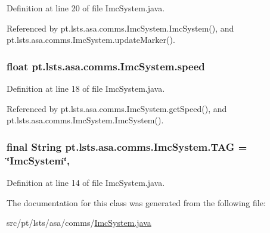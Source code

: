 Definition at line 20 of file Imc\+System.\+java.



Referenced by pt.\+lsts.\+asa.\+comms.\+Imc\+System.\+Imc\+System(), and pt.\+lsts.\+asa.\+comms.\+Imc\+System.\+update\+Marker().

\hypertarget{classpt_1_1lsts_1_1asa_1_1comms_1_1ImcSystem_a425d911ad6689aef73a9103ca5621db6}{}
\subsubsection[{speed}]{\setlength{\rightskip}{0pt plus 5cm}float pt.\+lsts.\+asa.\+comms.\+Imc\+System.\+speed\hspace{0.3cm}{\ttfamily [private]}}\label{classpt_1_1lsts_1_1asa_1_1comms_1_1ImcSystem_a425d911ad6689aef73a9103ca5621db6}


Definition at line 18 of file Imc\+System.\+java.



Referenced by pt.\+lsts.\+asa.\+comms.\+Imc\+System.\+get\+Speed(), and pt.\+lsts.\+asa.\+comms.\+Imc\+System.\+Imc\+System().

\hypertarget{classpt_1_1lsts_1_1asa_1_1comms_1_1ImcSystem_a1349eeeaa351e92843c1618d4f0ac5e6}{}
\subsubsection[{T\+A\+G}]{\setlength{\rightskip}{0pt plus 5cm}final String pt.\+lsts.\+asa.\+comms.\+Imc\+System.\+T\+A\+G = \char`\"{}Imc\+System\char`\"{}\hspace{0.3cm}{\ttfamily [static]}, {\ttfamily [private]}}\label{classpt_1_1lsts_1_1asa_1_1comms_1_1ImcSystem_a1349eeeaa351e92843c1618d4f0ac5e6}


Definition at line 14 of file Imc\+System.\+java.



The documentation for this class was generated from the following file\+:\begin{DoxyCompactItemize}
\item 
src/pt/lsts/asa/comms/\hyperlink{ImcSystem_8java}{Imc\+System.\+java}\end{DoxyCompactItemize}
